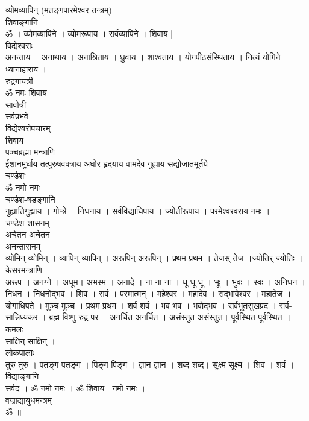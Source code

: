\documentclass[12pt]{article}
\begin{document}
{\large{\sktr
{\color{Brown} व्योमव्यापिन् (मतङ्गपारमेश्वर-तन्त्रम्)}\\[5pt]
{\color{CadetBlue} शिवाङ्गानि}\\[5pt]
{\color{NavyBlue}ॐ । व्योमव्यापिने । व्योमरूपाय । सर्वव्यापिने । शिवाय |}\\[5pt]
{\color{CadetBlue} विद्येश्वराः}\\[5pt]
{\color{NavyBlue}अनन्ताय । अनाथाय । अनाश्रिताय । ध्रुवाय । शाश्वताय । योगपीठसंस्थिताय । नित्यं योगिने । ध्यानाहाराय ।}\\[5pt]
{\color{CadetBlue} रुद्रगायत्री}\\[5pt]
{\color{NavyBlue} ॐ नमः शिवाय }\\[5pt]
{\color{CadetBlue} सावोत्री}\\[5pt]
{\color{NavyBlue}  सर्वप्रभवे }\\[5pt]
{\color{CadetBlue} विद्येश्वरोपचारम् } \\[5pt]
{\color{NavyBlue}  शिवाय}\\[5pt]
{\color{CadetBlue} पञ्चब्रह्मा-मन्त्राणि } \\[5pt]
{\color{NavyBlue} ईशानमूर्धाय तत्पुरुषवक्त्राय अघोर-हृदयाय  वामदेव-गुह्याय  सद्योजातमूर्तये }\\[5pt]
{\color{CadetBlue} चण्डेशः } \\[5pt]	
{\color{NavyBlue} ॐ नमो नमः }\\[5pt]
{\color{CadetBlue} चण्डेश-षडङ्गानि } \\[5pt]
{\color{NavyBlue}  गुह्यातिगुह्याय ।  गोप्त्रे  ।  निधनाय । सर्वविद्याधिपाय  ।  ज्योतीरूपाय  । परमेश्वरवराय नमः । }\\[5pt]	
{\color{CadetBlue} चण्डेश-शासनम् } \\[5pt]
{\color{NavyBlue} अचेतन अचेतन}\\[5pt]
{\color{CadetBlue} अनन्तासनम् } \\[5pt]
{\color{NavyBlue}  व्योमिन् व्योमिन् ।  व्यापिन् व्यापिन् । अरूपिन् अरूपिन् । प्रथम प्रथम ।  तेजस् तेज ।ज्योतिर्-ज्योतिः । \\[5pt] }
{\color{CadetBlue} केसरमन्त्राणि } \\[5pt]
{\color{NavyBlue}  अरूप । अनग्ने । अधूम। अभस्म । अनादे । ना ना ना ।  धू धू धू ।  भूः । भुवः । स्वः । अनिधन । निधन । निधनोद्भव । शिव ।  सर्व । परमात्मन् । महेश्वर । महादेव । सद्भावेश्वर । महातेज । योगाधिपते ।  मुञ्च मुञ्च । प्रथम प्रथम । शर्व शर्व । भव भव । भवोद्भव । सर्वभूतसुखप्रद ।  सर्व-सान्निध्यकर । ब्रह्म-विष्णु-रुद्र-पर । अनर्चित अनर्चित । असंस्तुत असंस्तुत। पूर्वस्थित पूर्वस्थित । }\\[5pt]
{\color{CadetBlue} कमलः } \\[5pt]	
{\color{NavyBlue} साक्षिन् साक्षिन् ।}\\[5pt]	
{\color{CadetBlue} लोकपालाः } \\[5pt]	
{\color{NavyBlue} तुरु तुरु । पतङ्ग पतङ्ग । पिङ्ग पिङ्ग । ज्ञान ज्ञान । शब्द शब्द। सूक्ष्म सूक्ष्म । शिव । शर्व ।  }\\[5pt]
{\color{CadetBlue} विद्याङ्गानि } \\[5pt]	
{\color{NavyBlue} सर्वद । ॐ नमो नमः । ॐ शिवाय | नमो नमः । }\\[5pt]
{\color{CadetBlue} वज्राद्यायुधमन्त्रम्} \\[5pt]	
{\color{NavyBlue} ॐ ॥}
}}
\end{document}

